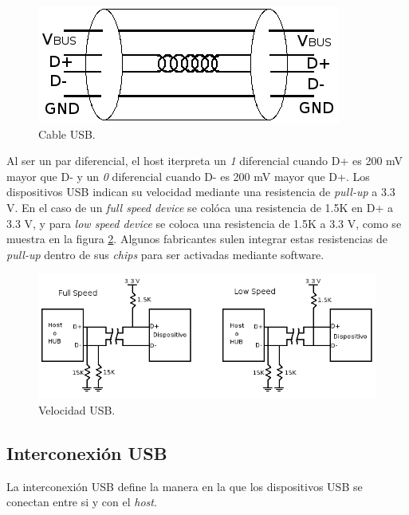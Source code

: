\begin{figure}
\centering
\includegraphics[scale=0.5]{./img/electric_usb.png}
\caption{Cable USB.}
\label{fig:electric_usb}
\end{figure}

Al ser un par diferencial, el host iterpreta un \emph{1} diferencial cuando D+
es 200 mV mayor que D- y un \emph{0} diferencial cuando D- es 200 mV mayor que
D+. 
Los dispositivos USB indican su velocidad mediante una resistencia de
\emph{pull-up} a 3.3 V. En el caso de un \emph{full speed device} se col\'oca
una resistencia de 1.5K en D+ a 3.3 V, y para \emph{low speed device} se coloca
una resistencia de 1.5K a 3.3 V, como se muestra en la figura
\ref{fig:electric_speed_usb}.
Algunos fabricantes sulen integrar estas resistencias de \emph{pull-up} dentro
de sus \emph{chips} para ser activadas mediante software.

\begin{figure}
\centering
\includegraphics[scale=0.5]{./img/electric_speed_usb.png}
\caption{Velocidad USB.}
\label{fig:electric_speed_usb}
\end{figure}


\subsection{Interconexi\'on USB}

La interconexi\'on USB define la manera en la que los dispositivos USB se
conectan entre si y con el \emph{host}. 

